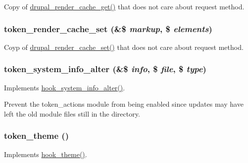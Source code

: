 \label{token_8module_ade265e3948eec87805cabf40bf0c233d}
Copy of \hyperlink{common_8inc_a8726783745547f4686cea624be0b0562}{drupal\_\-render\_\-cache\_\-get()} that does not care about request method. \hypertarget{token_8module_ab8f5c3ba81f8ff179b4e5be70a3ab54d}{
\subsubsection[{token\_\-render\_\-cache\_\-set}]{\setlength{\rightskip}{0pt plus 5cm}token\_\-render\_\-cache\_\-set (\&\$ {\em markup}, \/  \$ {\em elements})}}
\label{token_8module_ab8f5c3ba81f8ff179b4e5be70a3ab54d}
Coyp of \hyperlink{common_8inc_aee3169994180319d0fe2b1738825c54c}{drupal\_\-render\_\-cache\_\-set()} that does not care about request method. \hypertarget{token_8module_a9ae1dc9d82981ee97ee1921bebbf59fc}{
\subsubsection[{token\_\-system\_\-info\_\-alter}]{\setlength{\rightskip}{0pt plus 5cm}token\_\-system\_\-info\_\-alter (\&\$ {\em info}, \/  \$ {\em file}, \/  \$ {\em type})}}
\label{token_8module_a9ae1dc9d82981ee97ee1921bebbf59fc}
Implements \hyperlink{group__hooks_ga7dd7f887131916d5bbbb02ae87a9113e}{hook\_\-system\_\-info\_\-alter()}.

Prevent the token\_\-actions module from being enabled since updates may have left the old module files still in the directory. \hypertarget{token_8module_a6689af0bf91fa39c1859c95b59aafd5a}{
\subsubsection[{token\_\-theme}]{\setlength{\rightskip}{0pt plus 5cm}token\_\-theme ()}}
\label{token_8module_a6689af0bf91fa39c1859c95b59aafd5a}
Implements \hyperlink{group__hooks_ga013ccb45c7aaab1c16cf9691428c910d}{hook\_\-theme()}. 